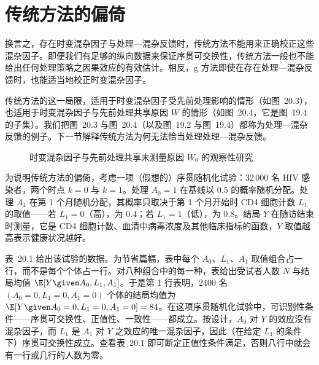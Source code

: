 \section{传统方法的偏倚}

换言之，存在时变混杂因子与处理—混杂反馈时，传统方法不能用来正确校正这些混杂因子。即便我们有足够的纵向数据来保证序贯可交换性，传统方法一般也不能给出任何处理策略之因果效应的有效估计。相反，g 方法即使在存在处理—混杂反馈时，也能适当地校正时变混杂因子。

传统方法的这一局限，适用于时变混杂因子受先前处理影响的情形（如图~20.3），也适用于时变混杂因子与先前处理共享原因 $W$ 的情形（如图~20.4，它是图~19.4 的子集）。我们把图~20.3 与图~20.4（以及图~19.2 与图~19.4）都称为处理—混杂反馈的例子。下一节解释传统方法为何无法恰当处理处理—混杂反馈。

\begin{figure}[htbp]
\centering
{}
\caption{时变混杂因子与先前处理共享未测量原因 $W_0$ 的观察性研究}
\label{fig:20.4}
\end{figure}

为说明传统方法的偏倚，考虑一项（假想的）序贯随机化试验：32\,000 名 HIV 感染者，两个时点 $k=0$ 与 $k=1$。处理 $A_0=1$ 在基线以 0.5 的概率随机分配。处理 $A_1$ 在第 1 个月随机分配，其概率只取决于第 1 个月开始时 CD4 细胞计数 $L_1$ 的取值——若 $L_1=0$（高），为 0.4；若 $L_1=1$（低），为 0.8。结局 $Y$ 在随访结束时测量，它是 CD4 细胞计数、血清中病毒浓度及其他临床指标的函数，$Y$ 取值越高表示健康状况越好。

表~20.1 给出该试验的数据。为节省篇幅，表中每个 $A_0$、$L_1$、$A_1$ 取值组合占一行，而不是每个个体占一行。对八种组合中的每一种，表给出受试者人数 $N$ 与结局均值 $\E[Y\given A_0,L_1,A_1]$。于是第 1 行表明，2400 名 $(A_0=0,L_1=0,A_1=0)$ 个体的结局均值为 $\E[Y\given A_0=0,L_1=0,A_1=0]=84$。在这项序贯随机化试验中，可识别性条件——序贯可交换性、正值性、一致性——都成立。按设计，$A_0$ 对 $Y$ 的效应没有混杂因子，而 $L_1$ 是 $A_1$ 对 $Y$ 之效应的唯一混杂因子，因此（在给定 $L_1$ 的条件下）序贯可交换性成立。查看表~20.1 即可断定正值性条件满足，否则八行中就会有一行或几行的人数为零。

